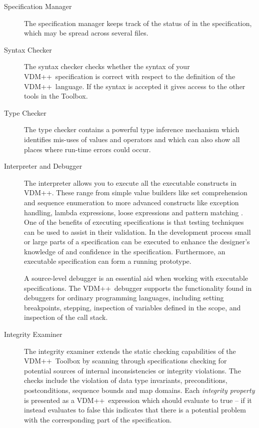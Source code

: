 \documentclass[\pformat,12pt]{article}
\newcommand{\vdmslpp}{VDM++}
\newcommand{\Toolbox}{Toolbox}
\begin{document}
\begin{description}
  
\item[Specification Manager] The specification manager keeps track of
  the status of  in the
  specification, which may be spread across several files.
 
\item[Syntax Checker] The syntax checker checks whether the syntax of
your \vdmslpp\ specification is correct with respect to the definition
of the \vdmslpp\ language. If the syntax is accepted it gives access
to the other tools in the \Toolbox.

\item[Type Checker]
  The type checker contains a powerful type inference mechanism which
  identifies mis-uses of values and operators and which can also show all
  places where run-time errors could occur.

\item[Interpreter and Debugger] The interpreter allows you
  to execute all the executable constructs in \vdmslpp. These range
  from simple value builders like set comprehension and sequence
  enumeration to more advanced constructs like exception handling,
  lambda expressions, loose expressions and pattern matching%
.  One of
  the benefits of executing specifications is that testing techniques
  can be used to assist in their validation. In the development
  process small or large parts of a specification can be executed to
  enhance the designer's knowledge of and confidence in the
  specification. Furthermore, an executable specification can form a
  running prototype.

  A source-level debugger is an essential aid when working
  with executable specifications. The \vdmslpp\ debugger supports the
  functionality found in debuggers for ordinary programming languages,
  including setting breakpoints, stepping, inspection of variables
  defined in the scope, and inspection of the call stack. 

\item[Integrity Examiner] The integrity examiner extends the static
  checking capabilities of the \vdmslpp\ Toolbox by scanning through
  specifications checking for potential sources of internal
  inconsistencies or integrity violations. The checks include the
  violation of data type invariants, preconditions,  postconditions,
  sequence bounds and map domains. Each \emph{integrity property} is 
  presented as a \vdmslpp\ expression which should evaluate to true --
  if it instead evaluates to false this indicates that there is a
  potential problem with the corresponding part of the specification. 


\end{description}
\end{document}
